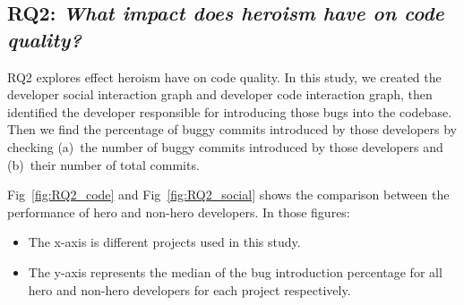 \documentclass[smallextended]{svjour3}
\newcommand{\bi}{\begin{itemize}}
\newcommand{\ei}{\end{itemize}}
\begin{document}
\subsection*{\textbf{RQ2: \textit{What impact does heroism have on code quality?}}}

RQ2 explores effect heroism have on code quality. In this study, we created the developer social interaction graph and developer code interaction graph, then identified the developer responsible for introducing those bugs into the codebase. Then we find the percentage of buggy commits introduced by those developers by checking (a)~the number of buggy commits introduced by those developers and (b)~their number of total commits.

Fig~\ref{fig:RQ2_code} and Fig~\ref{fig:RQ2_social}
shows the comparison between the performance of hero and non-hero developers. In those figures:
\bi
\item
The x-axis is different projects used in this study.
\item
The y-axis represents the median of the bug introduction percentage for all hero and non-hero developers for each project respectively.
\ei
\end{document}
